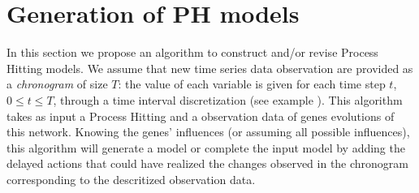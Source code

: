 
\section{Generation of PH models}
In this section we propose an algorithm to construct and/or revise Process Hitting models.
We assume that new time series data observation are provided as a {\it chronogram} of size $T$:
the value of each variable is given for each time step $t$, $0 \leq t \leq T$, through a time interval discretization (see example ).   
This algorithm takes as input a Process Hitting and a observation data of genes evolutions of this network.
Knowing the genes' influences (or assuming all possible influences),
this algorithm will generate a model or complete the input model by adding the delayed actions that could have realized the changes observed in the chronogram corresponding to the descritized observation data. 
\label{sec:ph-generation}






